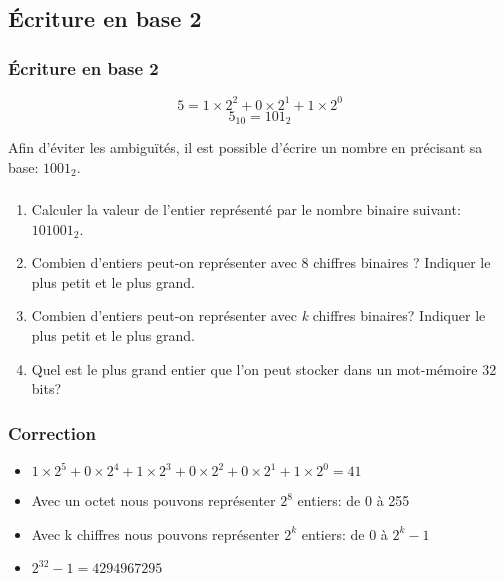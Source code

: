 \documentclass[svgnames,11pt]{beamer}
\begin{document}
\subsection{Écriture en base 2}
\begin{frame}
    \frametitle{Écriture en base 2}
    

    $$5 = 1×2^2 + 0×2^1 + 1×2^0$$
    $$5_{10}=101_2$$
    \begin{aretenir}[Remarque]
        Afin d'éviter les ambiguïtés, il est possible d'écrire un nombre en précisant sa base: $1001_2$.
    \end{aretenir}
\end{frame}
\begin{frame}
    \frametitle{}

    \begin{activite}
        \begin{enumerate}
        \item Calculer la valeur de l'entier représenté par le nombre binaire suivant: $101001_2$.
        \item Combien d'entiers peut-on représenter avec 8 chiffres binaires ? Indiquer le plus petit et le plus grand.
        \item Combien d'entiers peut-on représenter avec \emph{k} chiffres binaires? Indiquer le plus petit et le plus grand.
        \item Quel est le plus grand entier que l'on peut stocker dans un mot-mémoire 32 bits?
        \end{enumerate}
        \end{activite}

\end{frame}
\begin{frame}
    \frametitle{Correction}

    \begin{itemize}
        \item<1-> $1×2^5+0×2^4+1×2^3+0×2^2+0×2^1+1×2^0=41$
        \item<2-> Avec un octet nous pouvons représenter $2^8$ entiers: de 0 à 255
        \item<3-> Avec k chiffres nous pouvons représenter $2^k$ entiers: de 0 à $2^k−1$
        \item<4->$2^{32}-1=4294967295$
    \end{itemize}

\end{frame}
\end{document}
